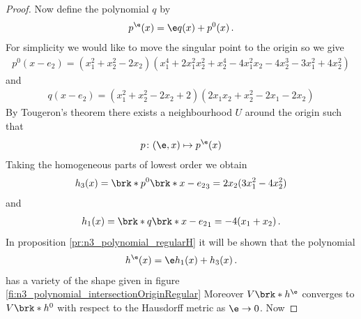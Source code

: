 \begin{proof}
  Now define the polynomial $q$ by
  \begin{align}
    p^\e(x)=\e q(x)+p^0(x)\,.
  \end{align}
  For simplicity we would like to move the singular point to the origin so we give
  \begin{align*}
    p^0(x-e_2)=(x_1^2 + x_2^2 - 2x_2)(x_1^4 + 2x_1^2x_2^2 + x_2^4 - 4x_1^2x_2 - 4x_2^3 - 3x_1^2 + 4x_2^2)
  \end{align*}
  and
  \begin{align*}
    q(x-e_2)=(x_1^2 + x_2^2 - 2x_2 + 2)(2x_1x_2 + x_2^2 - 2x_1 - 2x_2)
  \end{align*}
  By Tougeron's theorem there exists a neighbourhood $U$ around the origin such that
  \begin{align}
    p\colon (\e,x)\mapsto p^\e(x)
  \end{align}
  Taking the homogeneous parts of lowest order we obtain
  \begin{align*}
    h_3(x)=\brk*{p^0\brk*{x-e_2}}_3=2x_2(3x_1^2-4x_2^2)
  \end{align*}
  and
  \begin{align*}
    h_1(x)=\brk*{q\brk*{x-e_2}}_1=-4(x_1+x_2)\,.
  \end{align*}
  In proposition \ref{pr:n3_polynomial_regularH}
  it will be shown that the polynomial
  \begin{align}
    h^\e(x)=\e h_1(x)+h_3(x)\,.
  \end{align}
  has a variety of the shape given in figure \ref{fi:n3_polynomial_intersectionOriginRegular}
  Moreover $V\brk*{h^\e}$ converges to $V\brk*{h^0}$ with respect to the Hausdorff metric as
  $\e\to0$. Now 
\end{proof}



